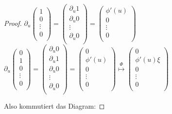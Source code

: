 \begin{proof}
$\partial_u \begin{pmatrix} 1\\
  0\\
  \vdots\\
  0\\
\end{pmatrix}
= \begin{pmatrix} \partial_u1\\
  \partial_u0\\
  \vdots\\
  \partial_u0\\
\end{pmatrix}
= \begin{pmatrix} \phi'(u)\\
  0\\
  \vdots\\
  0\\
\end{pmatrix}
$\\
$\partial_u \begin{pmatrix} 0\\
  1\\
  0\\
  \vdots\\
  0\\
\end{pmatrix}
= \begin{pmatrix} \partial_u0\\
  \partial_u1\\
  \partial_u0\\
  \vdots\\
  \partial_u0\\
\end{pmatrix}
= \begin{pmatrix} 0\\
  \phi'(u)\\
  0\\
  \vdots\\
  0\\
\end{pmatrix}
\overset{\Phi}{\mapsto} \begin{pmatrix} 0\\
  \phi'(u)\xi\\
  0\\
  \vdots\\
  0\\
\end{pmatrix}
$

Also kommutiert das Diagram:


\end{proof}
